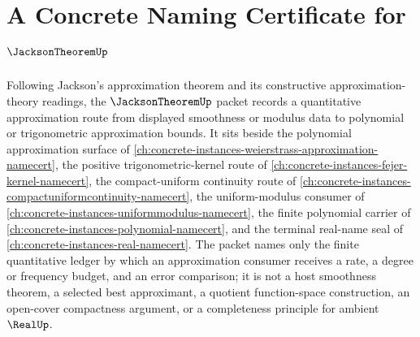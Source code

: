 \chapter{A Concrete Naming Certificate for $\JacksonTheoremUp$}
\label{ch:concrete-instances-jackson-theorem-namecert}

Following Jackson's approximation theorem and its constructive approximation-theory readings, the $\JacksonTheoremUp$ packet records a quantitative approximation route from displayed smoothness or modulus data to polynomial or trigonometric approximation bounds. It sits beside the polynomial approximation surface of \autoref{ch:concrete-instances-weierstrass-approximation-namecert}, the positive trigonometric-kernel route of \autoref{ch:concrete-instances-fejer-kernel-namecert}, the compact-uniform continuity route of \autoref{ch:concrete-instances-compactuniformcontinuity-namecert}, the uniform-modulus consumer of \autoref{ch:concrete-instances-uniformmodulus-namecert}, the finite polynomial carrier of \autoref{ch:concrete-instances-polynomial-namecert}, and the terminal real-name seal of \autoref{ch:concrete-instances-real-namecert}. The packet names only the finite quantitative ledger by which an approximation consumer receives a rate, a degree or frequency budget, and an error comparison; it is not a host smoothness theorem, a selected best approximant, a quotient function-space construction, an open-cover compactness argument, or a completeness principle for ambient $\RealUp$.

